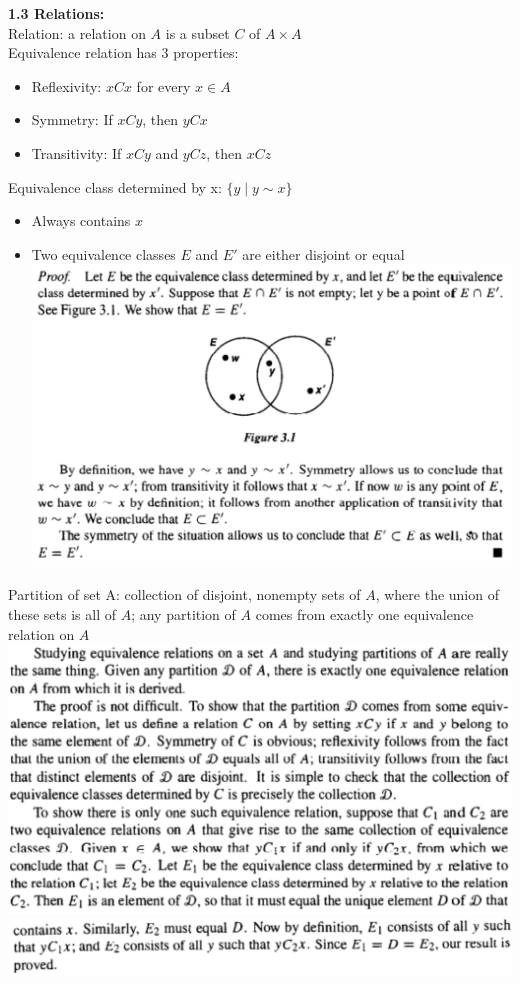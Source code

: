 \documentclass{article}
\begin{document}
\textbf{1.3 Relations:}\\
Relation: a relation on $A$ is a subset $C$ of $A \times A$\\
Equivalence relation has 3 properties:
\begin{itemize}
    \item Reflexivity: $xCx$ for every $x \in A$
    \item Symmetry: If $xCy$, then $yCx$
    \item Transitivity: If $xCy$ and $yCz$, then $xCz$
\end{itemize}
Equivalence class determined by x: $\{y \mid y \sim x\}$
\begin{itemize}
    \item Always contains $x$
    \item Two equivalence classes $E$ and $E'$ are either disjoint or equal\\ \includegraphics[scale=0.6]{test3StudyProofEquivalenceClasses.png}
\end{itemize}
Partition of set A: collection of disjoint, nonempty sets of $A$, where the union of these sets is all of $A$; any partition of $A$ comes from exactly one equivalence relation on $A$\\
\includegraphics[scale=0.75]{test3StudyProofPartitions1.png}\\
\includegraphics[scale=0.75]{test3StudyProofPartitions2.png}\\
\end{document}
